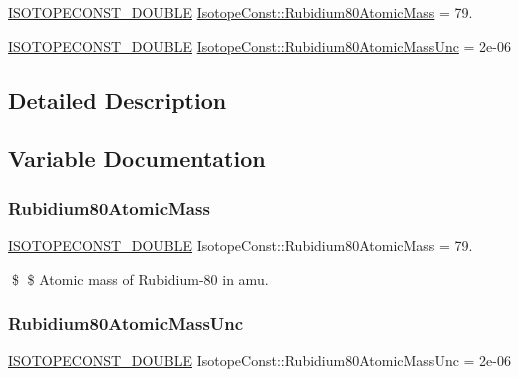 \begin{DoxyCompactItemize}
\item 
\mbox{\hyperlink{group___isotope_const-_macros_ga8f45a7272ce02c0b4c65c44636ed719a}{I\+S\+O\+T\+O\+P\+E\+C\+O\+N\+S\+T\+\_\+\+D\+O\+U\+B\+LE}} \mbox{\hyperlink{group___isotope_const-_rubidium-_rb80_ga8a60acfcc00f3c8c6ff0612a5b6477b2}{Isotope\+Const\+::\+Rubidium80\+Atomic\+Mass}} = 79.
\item 
\mbox{\hyperlink{group___isotope_const-_macros_ga8f45a7272ce02c0b4c65c44636ed719a}{I\+S\+O\+T\+O\+P\+E\+C\+O\+N\+S\+T\+\_\+\+D\+O\+U\+B\+LE}} \mbox{\hyperlink{group___isotope_const-_rubidium-_rb80_ga58d7d934187d6162b5b7e3c9209f82ae}{Isotope\+Const\+::\+Rubidium80\+Atomic\+Mass\+Unc}} = 2e-\/06
\end{DoxyCompactItemize}


\subsection{Detailed Description}


\subsection{Variable Documentation}
\mbox{\label{group___isotope_const-_rubidium-_rb80_ga8a60acfcc00f3c8c6ff0612a5b6477b2}} 
\subsubsection{\texorpdfstring{Rubidium80\+Atomic\+Mass}{Rubidium80AtomicMass}}
{\footnotesize\ttfamily \mbox{\hyperlink{group___isotope_const-_macros_ga8f45a7272ce02c0b4c65c44636ed719a}{I\+S\+O\+T\+O\+P\+E\+C\+O\+N\+S\+T\+\_\+\+D\+O\+U\+B\+LE}} Isotope\+Const\+::\+Rubidium80\+Atomic\+Mass = 79.}

\$ \$ Atomic mass of Rubidium-\/80 in amu. \mbox{\label{group___isotope_const-_rubidium-_rb80_ga58d7d934187d6162b5b7e3c9209f82ae}} 
\subsubsection{\texorpdfstring{Rubidium80\+Atomic\+Mass\+Unc}{Rubidium80AtomicMassUnc}}
{\footnotesize\ttfamily \mbox{\hyperlink{group___isotope_const-_macros_ga8f45a7272ce02c0b4c65c44636ed719a}{I\+S\+O\+T\+O\+P\+E\+C\+O\+N\+S\+T\+\_\+\+D\+O\+U\+B\+LE}} Isotope\+Const\+::\+Rubidium80\+Atomic\+Mass\+Unc = 2e-\/06}

